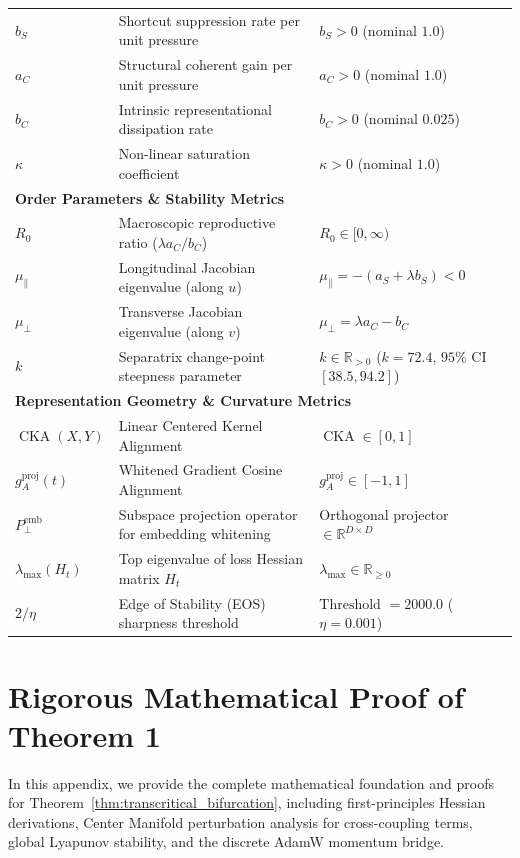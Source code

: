 \documentclass{article}
\theoremstyle{plain}
\theoremstyle{definition}
\DeclareMathOperator{\CKA}{CKA}
\begin{document}
\begin{table}[h]
\begin{small}
\begin{tabular}{lll}
$b_S$ & Shortcut suppression rate per unit pressure & $b_S > 0$ (nominal $1.0$) \\
$a_C$ & Structural coherent gain per unit pressure & $a_C > 0$ (nominal $1.0$) \\
$b_C$ & Intrinsic representational dissipation rate & $b_C > 0$ (nominal $0.025$) \\
$\kappa$ & Non-linear saturation coefficient & $\kappa > 0$ (nominal $1.0$) \\
\midrule
\multicolumn{3}{l}{\textbf{Order Parameters \& Stability Metrics}} \\
$R_0$ & Macroscopic reproductive ratio ($\lambda a_C / b_C$) & $R_0 \in [0, \infty)$ \\
$\mu_{\parallel}$ & Longitudinal Jacobian eigenvalue (along $u$) & $\mu_{\parallel} = -(a_S + \lambda b_S) < 0$ \\
$\mu_{\perp}$ & Transverse Jacobian eigenvalue (along $v$) & $\mu_{\perp} = \lambda a_C - b_C$ \\
$k$ & Separatrix change-point steepness parameter & $k \in \mathbb{R}_{> 0}$ ($k = 72.4$, $95\%$ CI $[38.5, 94.2]$) \\
\multicolumn{3}{l}{\textbf{Representation Geometry \& Curvature Metrics}} \\
$\CKA(X, Y)$ & Linear Centered Kernel Alignment & $\CKA \in [0, 1]$ \\
$g_A^{\text{proj}}(t)$ & Whitened Gradient Cosine Alignment & $g_A^{\text{proj}} \in [-1, 1]$ \\
$P_{\perp}^{\text{emb}}$ & Subspace projection operator for embedding whitening & Orthogonal projector $\in \mathbb{R}^{D \times D}$ \\
$\lambda_{\text{max}}(H_t)$ & Top eigenvalue of loss Hessian matrix $H_t$ & $\lambda_{\text{max}} \in \mathbb{R}_{\ge 0}$ \\
$2/\eta$ & Edge of Stability (EOS) sharpness threshold & $\text{Threshold } = 2000.0$ ($\eta = 0.001$) \\
\bottomrule
\end{tabular}
\end{small}
\end{table}

\section{Rigorous Mathematical Proof of Theorem 1}
\label{sec:appendix_proof}

In this appendix, we provide the complete mathematical foundation and proofs for Theorem~\ref{thm:transcritical_bifurcation}, including first-principles Hessian derivations, Center Manifold perturbation analysis for cross-coupling terms, global Lyapunov stability, and the discrete AdamW momentum bridge.
\end{document}
